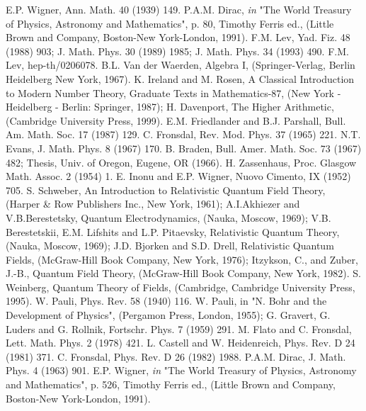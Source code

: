 \documentclass[a4paper,12pt]{article}%
\begin{document}
\begin{thebibliography}{99}
 E.P. Wigner, Ann. Math. 40 (1939) 149.
 P.A.M. Dirac, {\it in} "The World Treasury
of Physics, Astronomy and Mathematics", p. 80, Timothy Ferris ed.,
(Little Brown and Company, Boston-New York-London, 1991).
 F.M. Lev, Yad. Fiz. 48 (1988) 903; 
J. Math. Phys. 30 (1989) 1985; J. Math. Phys. 34 (1993) 490.
 F.M. Lev, hep-th/0206078.
 B.L. Van der Waerden, Algebra I, 
(Springer-Verlag, Berlin Heidelberg New York, 1967).
 K. Ireland and  M. Rosen, A Classical 
Introduction to Modern Number Theory, Graduate Texts in 
Mathematics-87, (New  York  - Heidelberg - Berlin: Springer, 1987); 
H. Davenport, The Higher Arithmetic, 
(Cambridge University Press, 1999).
 E.M. Friedlander and B.J. Parshall, Bull. Am.
Math. Soc. 17 (1987) 129.
 C. Fronsdal, Rev. Mod. Phys. 37 (1965) 221.
 N.T. Evans, J. Math. Phys. 8 (1967) 170. 
 B. Braden, Bull. Amer. Math. Soc. 
73 (1967) 482;
Thesis, Univ. of Oregon, Eugene, OR (1966).
 H. Zassenhaus, Proc. Glasgow Math. Assoc. 
2 (1954) 1.
 E. Inonu and E.P. Wigner, Nuovo Cimento, IX (1952) 705.
 S. Schweber, An Introduction to
Relativistic Quantum Field Theory, (Harper \& Row Publishers Inc.,
New York, 1961); 
A.I.Akhiezer and V.B.Berestetsky, Quantum
Electrodynamics, (Nauka, Moscow, 1969); 
V.B. Berestetskii, E.M. Lifshits and L.P. Pitaevsky,
Relativistic Quantum Theory, (Nauka, Moscow, 1969);
J.D. Bjorken and S.D. Drell, Relativistic 
Quantum Fields, (McGraw-Hill Book Company, New York, 1976);  
Itzykson, C., and Zuber, J.-B., Quantum Field Theory,
(McGraw-Hill Book Company, New York, 1982).
 S. Weinberg, Quantum Theory of Fields, 
(Cambridge, Cambridge University Press, 1995).
 W. Pauli, Phys. Rev. 58 (1940) 116.
 W. Pauli, in "N. Bohr and the Development of
Physics", (Pergamon Press, London, 1955); G. Gravert, G. Luders and
G. Rollnik, Fortschr. Phys. 7 (1959) 291.
 M. Flato and C. Fronsdal, Lett. Math. Phys.
2 (1978) 421.
 L. Castell and W. Heidenreich, Phys. Rev. 
D 24 (1981) 371.
 C. Fronsdal, Phys. Rev. D 26 (1982) 1988.
 P.A.M. Dirac, J. Math. Phys. 4 (1963) 901.
 E.P. Wigner, {\it in} "The World Treasury
of Physics, Astronomy and Mathematics", p. 526, Timothy Ferris ed.,
(Little Brown and Company, Boston-New York-London, 1991).
\end{thebibliography}
\end{document}
